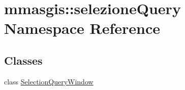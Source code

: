 \hypertarget{namespacemmasgis_1_1selezioneQuery}{
\section{mmasgis::selezioneQuery Namespace Reference}
\label{namespacemmasgis_1_1selezioneQuery}
}
\subsection*{Classes}
\begin{DoxyCompactItemize}
\item 
class \hyperlink{classmmasgis_1_1selezioneQuery_1_1SelectionQueryWindow}{SelectionQueryWindow}
\end{DoxyCompactItemize}
